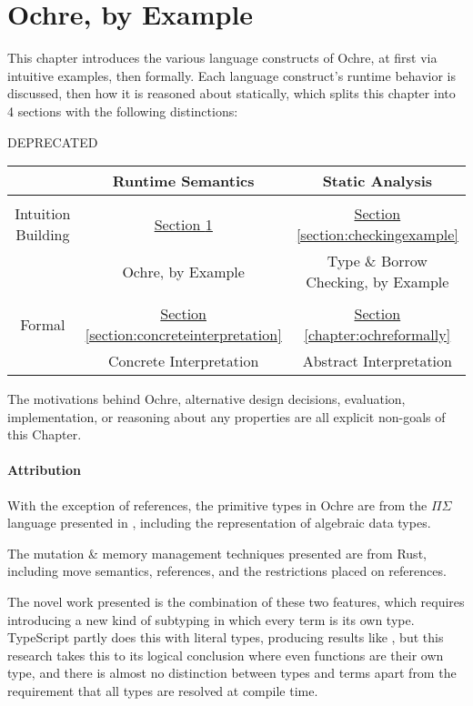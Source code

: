 \documentclass[12pt,twoside]{report}
\begin{document}
\chapter{Ochre, by Example}
\label{section:ochreexample}
This chapter introduces the various language constructs of Ochre, at first via intuitive examples, then formally. Each language construct's runtime behavior is discussed, then how it is reasoned about statically, which splits this chapter into 4 sections with the following distinctions:

DEPRECATED
\begin{center}
  \begin{tabular}{c|cc}
    & Runtime Semantics & Static Analysis \\
    \hline
    \\
    Intuition Building & \underline{Section \ref{section:ochreexample}} & \underline{Section \ref{section:checkingexample}} \\
    & Ochre, by Example & Type \& Borrow Checking, by Example \\
    \\
    Formal & \underline{Section \ref{section:concreteinterpretation}} & \underline{Section \ref{chapter:ochreformally}} \\
    & Concrete Interpretation & Abstract Interpretation \\
  \end{tabular}
\end{center}

The motivations behind Ochre, alternative design decisions, evaluation, implementation, or reasoning about any properties are all explicit non-goals of this Chapter.

\subsubsection{Attribution}
With the exception of references, the primitive types in Ochre are from the $\Pi\Sigma$ language presented in \cite{altenkirch2010pisigma}, including the representation of algebraic data types.

The mutation \& memory management techniques presented are from Rust, including move semantics, references, and the restrictions placed on references.

The novel work presented is the combination of these two features, which requires introducing a new kind of subtyping in which every term is its own type. TypeScript partly does this with literal types, producing results like , but this research takes this to its logical conclusion where even functions are their own type, and there is almost no distinction between types and terms apart from the requirement that all types are resolved at compile time.
\end{document}
